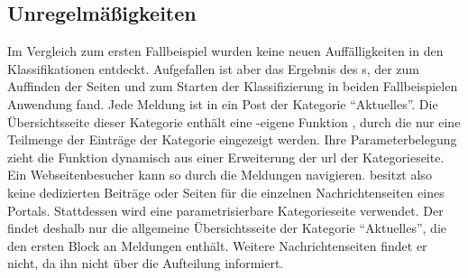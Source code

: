 \subsection{Unregelmäßigkeiten}
    Im Vergleich zum ersten Fallbeispiel
    wurden keine neuen Auffälligkeiten in den Klassifikationen entdeckt.
    Aufgefallen ist aber das Ergebnis des {\wordpressCrawler}s,
    der zum Auffinden der Seiten und zum Starten der Klassifizierung
    in beiden Fallbeispielen Anwendung fand.   
    Jede Meldung ist in {\wordpress} ein Post der Kategorie "`Aktuelles"'.
    Die Übersichtsseite dieser Kategorie enthält eine {\wordpress}-eigene
    Funktion \cite[Kapitel "`Pagination"']{wordpress:codex},
    durch die nur eine Teilmenge der Einträge der Kategorie eingezeigt werden.
    Ihre Parameterbelegung zieht die Funktion dynamisch aus einer Erweiterung der
    \gls{url} der Kategorieseite.
    Ein Webseitenbesucher kann so durch die Meldungen navigieren.
    {\wordpress} besitzt also keine dedizierten Beiträge oder Seiten
    für die einzelnen Nachrichtenseiten eines Portals.
    Stattdessen wird eine parametrisierbare Kategorieseite verwendet.
    Der {\wordpressCrawler} findet deshalb nur die allgemeine Übersichtsseite der Kategorie "`Aktuelles"',
    die den ersten Block an Meldungen enthält.
    Weitere Nachrichtenseiten findet er nicht,
    da {\wordpress} ihn nicht über die Aufteilung informiert.
